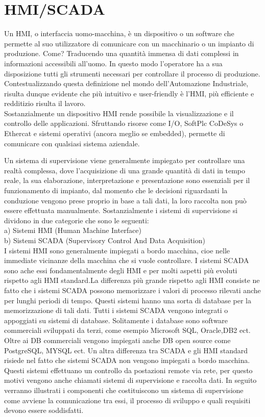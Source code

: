 \documentclass[12pt, a4paper, oneside]{book}
\begin{document}
\chapter{HMI/SCADA}
Un HMI, o interfaccia uomo-macchina, è un dispositivo o un software che permette al suo utilizzatore di comunicare con un macchinario o un impianto di produzione. Come? Traducendo una quantità immensa di dati complessi in informazioni accessibili all'uomo. In questo modo l'operatore ha a sua disposizione tutti gli strumenti necessari per controllare il processo di produzione.
Contestualizzando questa definizione nel mondo dell'Automazione Industriale, risulta dunque evidente che più intuitivo e user-friendly è l'HMI, più efficiente e redditizio risulta il lavoro.
\\Sostanzialmente un dispositivo HMI rende possibile la visualizzazione e il controllo delle applicazioni. Sfruttando risorse come I/O, SoftPlc CoDeSys o Ethercat e sistemi operativi (ancora meglio se embedded), permette di comunicare con qualsiasi sistema aziendale.

Un sistema di supervisione viene generalmente impiegato per controllare una realtà complessa, dove l'acquisizione di una grande quantità di dati in tempo reale, la sua elaborazione, interpretazione e presentazione sono essenziali per il funzionamento di impianto, dal momento che le decisioni riguardanti la conduzione vengono prese proprio in base a tali dati, la loro raccolta non può essere effettuata manualmente. Sostanzialmente i sistemi di supervisione si dividono in due categorie che sono le seguenti:
\\a) Sistemi HMI (Human Machine Interface)
\\b) Sistemi SCADA (Supervisory Control And Data Acquisition)
\\I sistemi HMI sono generalmente impiegati a bordo macchina,  cioe nelle immediate vicinanze della macchina che si vuole controllare. I sistemi SCADA sono ache essi fondamentalmente degli HMI e per molti aspetti più evoluti rispetto agli HMI standard.La differenza più grande rispetto agli HMI consiste ne fatto che i sistemi SCADA possono memorizzare i valori di processo rilevati anche per lunghi periodi di tempo. Questi sistemi hanno una sorta di database per la memorizzazione di tali dati. Tutti i sistemi SCADA vengono integrati o appoggiati su sistemi di database. Solitamente i database sono software commerciali sviluppati da terzi, come esempio Microsoft SQL, Oracle,DB2 ect. Oltre ai DB commerciali vengono impiegati anche DB open source come PostgreSQL, MYSQL ect. Un altra differenza tra SCADA e gli HMI standard risiede nel fatto che sistemi SCADA non vengono impiegati a bordo macchina. Questi sistemi effettuano un controllo da postazioni remote via rete, per questo motivi vengono anche chiamati sistemi di supervisione e raccolta dati. In seguito verranno illustrati i componenti che costituiscono un sistema di supervisione come avviene la comunicazione tra essi,  il processo di sviluppo e quali requisiti devono essere soddisfatti. 
\end{document}
